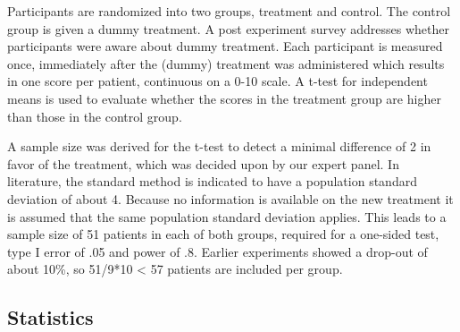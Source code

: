 \documentclass[]{article}
\begin{document}
Participants are randomized into two groups, treatment and control. The
control group is given a dummy treatment. A post experiment survey
addresses whether participants were aware about dummy treatment. Each
participant is measured once, immediately after the (dummy) treatment
was administered which results in one score per patient, continuous on a
0-10 scale. A t-test for independent means is used to evaluate whether
the scores in the treatment group are higher than those in the control
group.

A sample size was derived for the t-test to detect a minimal difference
of 2 in favor of the treatment, which was decided upon by our expert
panel. In literature, the standard method is indicated to have a
population standard deviation of about 4. Because no information is
available on the new treatment it is assumed that the same population
standard deviation applies. This leads to a sample size of 51 patients
in each of both groups, required for a one-sided test, type I error of
.05 and power of .8. Earlier experiments showed a drop-out of about
10\%, so 51/9*10 \textless{} 57 patients are included per group.

\subsection{Statistics}\label{statistics}
\end{document}
